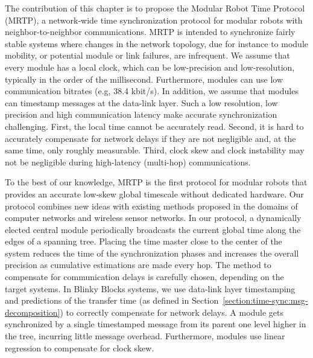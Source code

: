 The contribution of this chapter is to propose the Modular Robot Time Protocol (MRTP), a network-wide time synchronization protocol for modular robots with neighbor-to-neighbor communications. MRTP is intended to synchronize fairly stable systems where changes in the network topology, due for instance to module mobility, or potential module or link failures, are infrequent. We assume that every module has a local clock, which can be low-precision and low-resolution, typically in the order of the millisecond. Furthermore, modules can use low communication bitrates (e.g, 38.4 kbit/s). In addition, we assume that modules can timestamp messages at the data-link layer. Such a low resolution, low precision and high communication latency make accurate synchronization challenging. First, the local time cannot be accurately read. Second, it is hard to accurately compensate for network delays if they are not negligible and, at the same time, only roughly measurable. Third, clock skew and clock instability may not be negligible during high-latency (multi-hop) communications.

To the best of our knowledge, MRTP is the first protocol for modular robots that provides an accurate low-skew global timescale without dedicated hardware. Our protocol combines new ideas with existing methods proposed in the domains of computer networks and wireless sensor networks. In our protocol, a dynamically elected central module periodically broadcasts the current global time along the edges of a spanning tree. Placing the time master close to the center of the system reduces the time of the synchronization phases and increases the overall precision as cumulative estimations are made every hop. The method to compensate for communication delays is carefully chosen, depending on the target systems. In Blinky Blocks systems, we use data-link layer timestamping and predictions of the transfer time (as defined in Section~\ref{section:time-sync:msg-decomposition}) to correctly compensate for network delays. A module gets synchronized by a single timestamped message from its parent one level higher in the tree, incurring little message overhead. Furthermore, modules use linear regression to compensate for clock skew.

